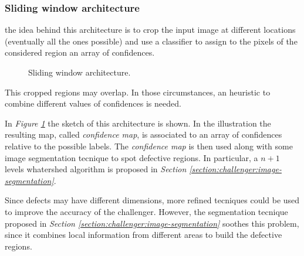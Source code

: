 \subsubsection{Sliding window architecture}
\par{
	the idea behind this architecture is to crop the input image at different locations (eventually all the ones possible) and use a classifier to assign to the pixels of the considered region an array of confidences.
}
\begin{figure}
	\centering
	\caption{Sliding window architecture.}\label{fig:sliding-window}
\end{figure}
\par{
	This cropped regions may overlap. In those circumstances, an heuristic to combine different values of confidences is needed.
}
\par{
	In \emph{Figure \ref{fig:sliding-window}} the sketch of this architecture is shown. In the illustration the resulting map, called \emph{confidence map}, is associated to an array of confidences relative to the possible labels. The \emph{confidence map} is then used along with some image segmentation tecnique to spot defective regions. In particular, a $n+1$ levels whatershed algorithm is proposed in \emph{Section \ref{section:challenger:image-segmentation}}.
}
\par{
	Since defects may have different dimensions, more refined tecniques could be used to improve the accuracy of the challenger. However, the segmentation tecnique proposed in \emph{Section \ref{section:challenger:image-segmentation}} soothes this problem, since it combines local information from different areas to build the defective regions.
}
